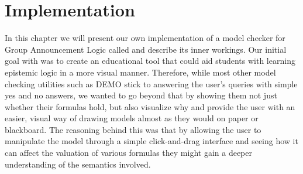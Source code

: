 \section{Implementation}\label{sec:impl}








In this chapter we will present our own implementation of a model checker for Group Announcement Logic called \cname and describe its inner workings. Our initial goal with \cname was to create an educational tool that could aid students with learning epistemic logic in a more visual manner. Therefore, while most other model checking utilities such as DEMO \cite{JanvanEijck} stick to answering the user's queries with simple yes and no answers, we wanted to go beyond that by showing them not just whether their formulas hold, but also visualize why and provide the user with an easier, visual way of drawing models almost as they would on paper or blackboard. The reasoning behind this was that by allowing the user to manipulate the model through a simple click-and-drag interface and seeing how it can affect the valuation of various formulas they might gain a deeper understanding of the semantics involved.

